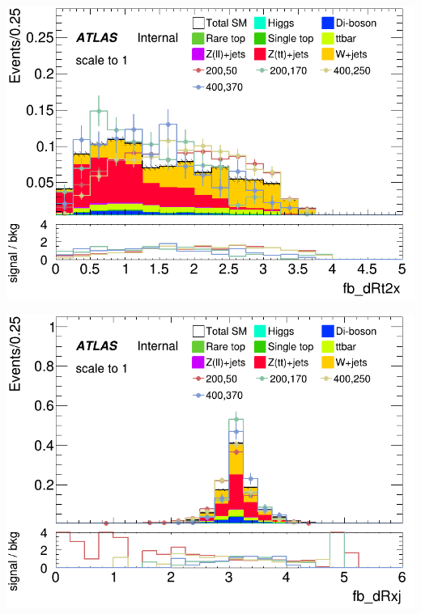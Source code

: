 \documentclass[usenames,dvipsnames]{beamer}
\begin{document}
\begin{frame}
    \begin{minipage}{0.32\textwidth}
        \centering
        \includegraphics[width=\textwidth]{graphics/HH_met_sig/HH_fb_dRt2x_norm.png}
    \end{minipage}
    \hfill
    \begin{minipage}{0.32\textwidth}
        \centering
        \includegraphics[width=\textwidth]{graphics/HH_met_sig/HH_fb_dRxj_norm.png}
    \end{minipage}
    \hfill
    \begin{minipage}{0.32\textwidth}
        \centering

\end{minipage}
\end{frame}
\end{document}
